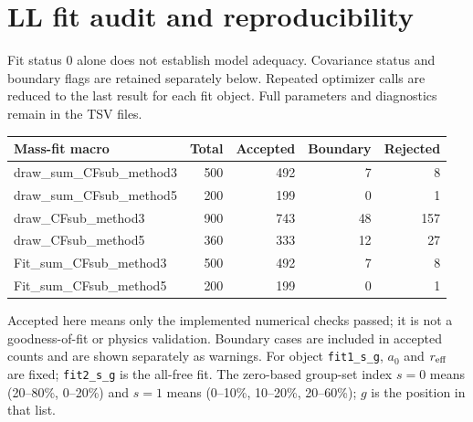 \documentclass[11pt,a4paper]{article}
\begin{document}
\clearpage\section{LL fit audit and reproducibility}
Fit status 0 alone does not establish model adequacy. Covariance status and boundary flags are retained separately below. Repeated optimizer calls are reduced to the last result for each fit object. Full parameters and diagnostics remain in the TSV files.
{\small\begin{longtable}{lrrrr}\hline Mass-fit macro & Total & Accepted & Boundary & Rejected\\\hline\endhead
draw\_sum\_CFsub\_method3 & 500 & 492 & 7 & 8\\
draw\_sum\_CFsub\_method5 & 200 & 199 & 0 & 1\\
draw\_CFsub\_method3 & 900 & 743 & 48 & 157\\
draw\_CFsub\_method5 & 360 & 333 & 12 & 27\\
Fit\_sum\_CFsub\_method3 & 500 & 492 & 7 & 8\\
Fit\_sum\_CFsub\_method5 & 200 & 199 & 0 & 1\\
\hline\end{longtable}}
Accepted here means only the implemented numerical checks passed; it is not a goodness-of-fit or physics validation. Boundary cases are included in accepted counts and are shown separately as warnings.
For object \texttt{fit1\_s\_g}, $a_0$ and $r_{\rm eff}$ are fixed; \texttt{fit2\_s\_g} is the all-free fit. The zero-based group-set index $s=0$ means (20--80\%, 0--20\%) and $s=1$ means (0--10\%, 10--20\%, 20--60\%); $g$ is the position in that list.
\end{document}
